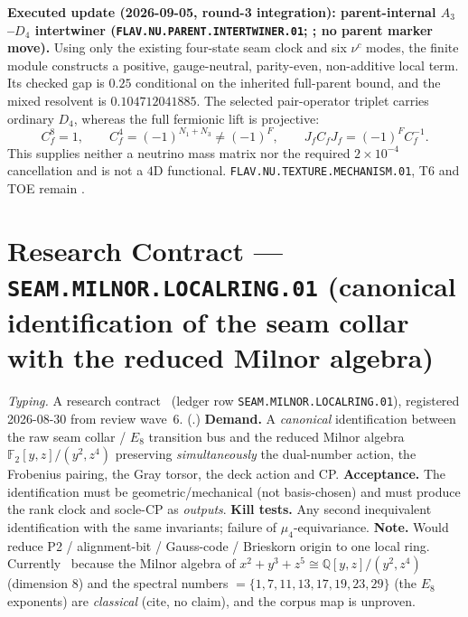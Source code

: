 \documentclass[11pt,a4paper]{article}
\begin{document}
\par\smallskip\noindent\textbf{Executed update (2026-09-05, round-3 integration):
parent-internal $A_3$--$D_4$ intertwiner
(\texttt{FLAV.NU.PARENT.INTERTWINER.01};
; no parent
marker move).}
Using only the existing four-state seam clock and six $\nu^c$ modes, the finite module
constructs a positive, gauge-neutral, parity-even, non-additive local term.  Its checked
gap is $0.25$ conditional on the inherited full-parent bound, and the mixed resolvent is
$0.104712041885$.  The selected pair-operator triplet carries ordinary $D_4$, whereas
the full fermionic lift is projective:
\[
 C_f^8=1,\qquad C_f^4=(-1)^{N_1+N_3}\ne(-1)^F,\qquad
 J_fC_fJ_f=(-1)^F C_f^{-1}.
\]
This supplies neither a neutrino mass matrix nor the required
$2{\times}10^{-4}$ cancellation and is not a $4$D functional.
\texttt{FLAV.NU.TEXTURE.MECHANISM.01}, T6 and TOE remain \mO.

\section*{Research Contract --- \texttt{SEAM.MILNOR.LOCALRING.01} (canonical identification of the seam collar with the reduced Milnor algebra)}
\noindent\emph{Typing.} A research contract \mO\ (ledger row
\texttt{SEAM.MILNOR.LOCALRING.01}), registered 2026-08-30 from review wave~6.
(.)
\textbf{Demand.}  A \emph{canonical} identification between the raw seam collar / $E_8$
transition bus and the reduced Milnor algebra $\mathbb F_2[y,z]/(y^2,z^4)$ preserving
\emph{simultaneously} the dual-number action, the Frobenius pairing, the Gray torsor, the
deck action and CP.  \textbf{Acceptance.}  The identification must be geometric/mechanical
(not basis-chosen) and must produce the rank clock and socle-CP as \emph{outputs}.
\textbf{Kill tests.}  Any second inequivalent identification with the same invariants; failure
of $\mu_4$-equivariance.  \textbf{Note.}  Would reduce P2 / alignment-bit / Gauss-code /
Brieskorn origin to one local ring.  Currently \mO\ because the Milnor algebra of
$x^2+y^3+z^5\cong\mathbb Q[y,z]/(y^2,z^4)$ (dimension $8$) and the spectral numbers
$=\{1,7,11,13,17,19,23,29\}$ (the $E_8$ exponents) are \emph{classical} (cite, no claim),
and the corpus map is unproven.
\end{document}
